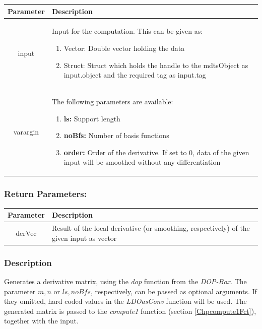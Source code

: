 \documentclass[a4]{scrreprt}
\begin{document}
\begin{longtabu} to \textwidth {|c|X|}
	\hline
	\textbf{Parameter} & \textbf{Description} \\ \hline
	\endhead
	input & Input for the computation. This can be given as:
	\begin{enumerate}
		\item Vector: Double vector holding the data
		\item Struct: Struct which holds the handle to the mdtsObject as input.object and the required tag as input.tag 
	\end{enumerate} \\ \hline
	varargin & The following parameters are available:
	\begin{enumerate}
		\item \textbf{ls:} Support length
		\item \textbf{noBfs:} Number of basis functions
		\item \textbf{order:} Order of the derivative. If set to 0, data of the given input will be smoothed without any differentiation
	\end{enumerate} \\ \hline
\end{longtabu}

\subsubsection{Return Parameters:}

\begin{longtabu} to \textwidth {|c|X|}
	\hline
	\textbf{Parameter} & \textbf{Description} \\ \hline
	\endhead
	derVec & Result of the local derivative (or smoothing, respectively) of the given input as vector \\ \hline
\end{longtabu}

\subsubsection{Description}

Generates a derivative matrix, using the \textit{dop} function from the \textit{DOP-Box}. The parameter $m, n$ or $ls, noBfs$, respectively, can be passed as optional arguments. If they omitted, hard coded values in the \textit{LDOasConv} function will be used. The generated matrix is passed to the \textit{compute1} function (section \ref{Chpcompute1Fct}), together with the input.
\end{document}
